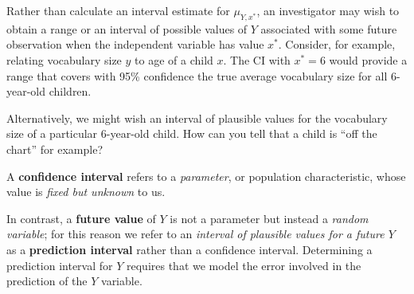 Rather than calculate an interval estimate for $\mu_{Y, x^*}$, an
investigator may wish to obtain a range or an interval of
possible values of $Y$ associated with some future
observation when the independent variable has value $x^*$. Consider, for example, relating vocabulary size $y$ to age of
a child $x$. The CI with $x^* = 6$ would provide a range that
covers with 95\% confidence the true average vocabulary
size for all 6-year-old children.

Alternatively, we might wish an interval of plausible values
for the vocabulary size of a particular 6-year-old child. How
can you tell that a child is ``off the chart'' for example?

A \textbf{confidence interval} refers to a \textit{parameter}, or population
characteristic, whose value is \textit{fixed but unknown} to us.

In contrast, a \textbf{future value} of $Y$ is not a parameter but
instead a \textit{random variable}; for this reason we refer to an
\textit{interval of plausible values for a future $Y$} as a \textbf{prediction
interval} rather than a confidence interval. Determining a prediction interval for $Y$ requires that we
model the error involved in the prediction of the $Y$ variable.

